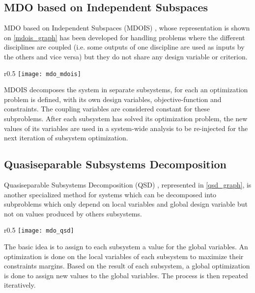 \subsection{MDO based on Independent Subspaces}

MDO based on Independent Subspaces (MDOIS) \cite{NME:NME1380}, whose representation is shown on \figurename{} \ref{mdois_graph} has been developed for handling problems where the different disciplines are coupled (i.e. some outputs of one discipline are used as inputs by the others and vice versa) but they do not share any design variable or criterion.

\begin{wrapfigure}{r}{0.5\textwidth}
\centering
\texttt{[image: mdo\_mdois]}
\caption{MDOIS method}\label{mdois_graph}
\end{wrapfigure}

MDOIS decomposes the system in separate subsystems, for each an optimization problem is defined, with its own design variables, objective-function and constraints. The coupling variables are considered constant for these subproblems. After each subsystem has solved its optimization problem, the new values of its variables are used in a system-wide analysis to be re-injected for the next iteration of subsystem optimization.

\subsection{Quasiseparable Subsystems Decomposition}

Quasiseparable Subsystems Decomposition (QSD) \cite{1389-4420}, represented in \figurename{} \ref{qsd_graph}, is another specialized method for systems which can be decomposed into subproblems which only depend on local variables and global design variable but not on values produced by others subsystems.

\begin{wrapfigure}{r}{0.5\textwidth}
\centering
\texttt{[image: mdo\_qsd]}
\caption{QSD method}\label{qsd_graph}
\end{wrapfigure}

The basic idea is to assign to each subsystem a value for the global variables. An optimization is done on the local variables of each subsystem to maximize their constraints margins. Based on the result of each subsystem, a global optimization is done to assign new values to the global variables. The process is then repeated iteratively.

